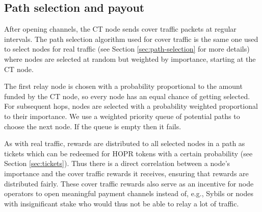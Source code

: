\subsection{Path selection and payout}
\label{sec:ct:pathselection}

After opening channels, the CT node sends cover traffic packets at regular intervals. The path selection algorithm used for cover traffic is the same one used to select nodes for real traffic (see Section \ref{sec:path-selection} for more details) where nodes are selected at random but weighted by importance, starting at the CT node.

The first relay node is chosen with a probability proportional to the amount funded by the CT node, so every node has an equal chance of getting selected. For subsequent hops, nodes are selected with a probability weighted proportional to their importance. We use a weighted priority queue of potential paths to choose the next node. If the queue is empty then it fails.

As with real traffic, rewards are distributed to all selected nodes in a path as tickets which can be redeemed for HOPR tokens with a certain probability (see Section \ref{sec:tickets}). Thus there is a direct correlation between a node's importance and the cover traffic rewards it receives, ensuring that rewards are distributed fairly. These cover traffic rewards also serve as an incentive for node operators to open meaningful payment channels instead of, e.g., Sybils or nodes with insignificant stake who would thus not be able to relay a lot of traffic.
